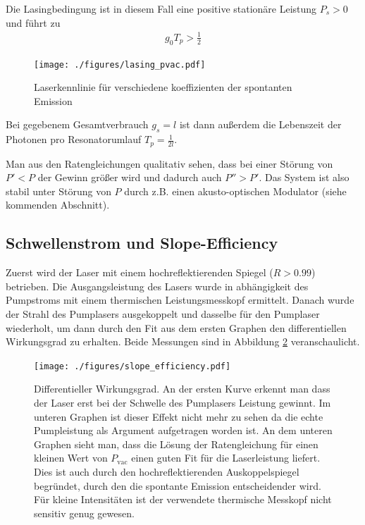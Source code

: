\documentclass[11pt,twoside=semi]{scrartcl}
\begin{document}
Die Lasingbedingung ist in diesem Fall eine positive stationäre Leistung
$P_s > 0$ und führt zu
%
\begin{align*}
  g_0 T_p > \frac{1}{2}
\end{align*}
%
\begin{figure}
  \centering
  \texttt{[image: ./figures/lasing\_pvac.pdf]}
  \caption{Laserkennlinie für verschiedene koeffizienten der spontanten
  Emission}
  \label{fig:lasing_pvac}
\end{figure}

Bei gegebenem Gesamtverbrauch $g_s=l$ ist dann außerdem die Lebenszeit der Photonen
pro Resonatorumlauf $T_p = \frac{1}{2 l}$. 

Man aus den Ratengleichungen qualitativ sehen, dass bei einer Störung von $P'<P$
der Gewinn größer wird und dadurch auch $P'' > P'$. Das System ist also stabil unter
Störung von $P$ durch z.B. einen akusto-optischen Modulator (siehe kommenden Abschnitt).

\newpage


\subsection{Schwellenstrom und Slope-Efficiency}
Zuerst wird der Laser mit einem hochreflektierenden Spiegel ($R > 0.99$) betrieben.
Die Ausgangsleistung des Lasers wurde in abhängigkeit des Pumpstroms mit einem 
thermischen Leistungsmesskopf ermittelt. Danach wurde der Strahl des Pumplasers
ausgekoppelt und dasselbe für den Pumplaser wiederholt, um dann durch den Fit
aus dem ersten Graphen den differentiellen Wirkungsgrad zu erhalten. Beide
Messungen sind in Abbildung \ref{fig:slope_efficiency} veranschaulicht.

\begin{figure}
  \centering
  \texttt{[image: ./figures/slope\_efficiency.pdf]}
  \caption{Differentieller Wirkungsgrad. An der ersten Kurve erkennt man
  dass der Laser erst bei der Schwelle des Pumplasers Leistung gewinnt. Im
  unteren Graphen ist dieser Effekt nicht mehr zu sehen da die echte
  Pumpleistung als Argument aufgetragen worden ist. An dem unteren Graphen
  sieht man, dass die Lösung der Ratengleichung für einen kleinen Wert von
  $P_\text{vac}$ einen guten Fit für die Laserleistung liefert. Dies ist auch
  durch den hochreflektierenden Auskoppelspiegel begründet, durch den die
  spontante Emission entscheidender wird.  Für kleine Intensitäten ist der
  verwendete thermische Messkopf nicht sensitiv genug gewesen.}

  \label{fig:slope_efficiency}
\end{figure}
\end{document}
